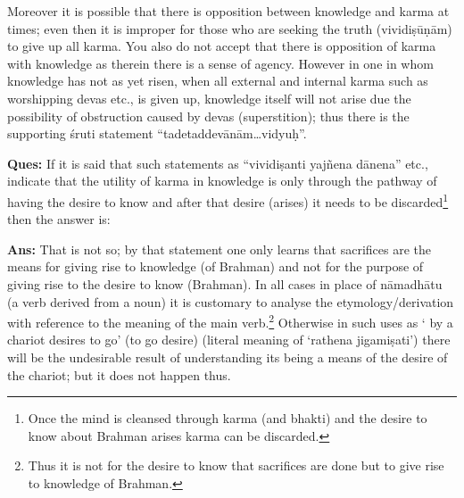 \vskip -2pt

Moreover it is possible that there is opposition between knowledge and karma at times; even then it is improper for those who are seeking the truth (vividiṣūṇām) to give up all karma. You also do not accept that there is opposition of karma with knowledge as therein there is a sense of agency. However in one in whom knowledge has not as yet risen, when all external and internal karma  such as worshipping devas etc., is given up, knowledge itself will not arise due the possibility of obstruction caused by devas (superstition); thus there is the supporting  śruti statement “tadetaddevānām…vidyuḥ”.

\vskip -2pt

\textbf{Ques:} If it is said that such statements as “vividiṣanti yajñena dānena” etc., indicate that the utility of karma in knowledge is only through the pathway of having the desire to know and after that desire (arises) it needs to be discarded\footnote{Once the mind is cleansed through karma (and bhakti) and the desire to know about Brahman arises karma can be discarded.} then the answer is:

\vskip -2pt

\textbf{Ans:} That is not so; by that statement one only learns that sacrifices are the means for giving rise to knowledge (of Brahman) and not for the purpose of giving rise to the desire to know (Brahman). In all cases in place of nāmadhātu (a verb derived from a noun) it is customary to analyse the etymology/derivation with reference to the meaning of the main verb.\footnote{Thus it is not for the desire to know that sacrifices are done but to give rise to knowledge of Brahman.} Otherwise in such uses as ‘ by a chariot desires to go’ (to go desire) (literal meaning of ‘rathena jigamiṣati’) there will be the undesirable result of understanding its being  a means of the desire of the chariot; but it does not happen thus.

